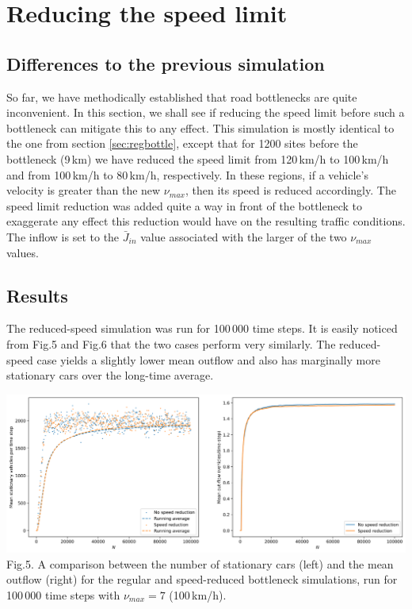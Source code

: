 \documentclass[11pt]{article}
\begin{document}
	\section{Reducing the speed limit}\label{sec:limit}
	
	\subsection{Differences to the previous simulation}\label{subsec:new}
	
	So far, we have methodically established that road bottlenecks are quite inconvenient. In this section, we shall see if reducing the speed limit before such a bottleneck can mitigate this to any effect. This simulation is mostly identical to the one from section \ref{sec:regbottle}, except that for 1200 sites before the bottleneck (9\,km) we have reduced the speed limit from 120\,km/h to 100\,km/h and from 100\,km/h to 80\,km/h, respectively. In these regions, if a vehicle's velocity is greater than the new $\nu_{max}$, then its speed is reduced accordingly. The speed limit reduction was added quite a way in front of the bottleneck to exaggerate any effect this reduction would have on the resulting traffic conditions. The inflow is set to the $\bar{J}_{in}$ value associated with the larger of the two $\nu_{max}$ values.\\
	
	
	\subsection{Results}\label{subsec:results}
	
	The reduced-speed simulation was run for 100\,000 time steps. It is easily noticed from Fig.5 and Fig.6 that the two cases perform very similarly. The reduced-speed case yields a slightly lower mean outflow and also has marginally more stationary cars over the long-time average. \\
	
	\begin{center}
		\includegraphics[scale=0.46]{Figures/Speedlimit_bottleneck_vmax7.png}\\
		Fig.5.	
		A comparison between the number of stationary cars (left) and the mean outflow (right) for the regular and speed-reduced bottleneck simulations, run for 100\,000 time steps with $\nu_{max}=7$ (100\,km/h). \\
	\end{center}
\end{document}

